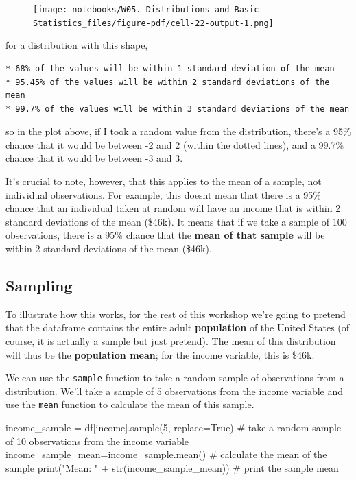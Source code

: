 \documentclass[
  letterpaper,
  DIV=11,
  numbers=noendperiod]{scrreprt}
\newenvironment{Shaded}{\begin{snugshade}}{\end{snugshade}}
\newcommand{\BuiltInTok}[1]{\textcolor[rgb]{0.00,0.23,0.31}{#1}}
\newcommand{\CommentTok}[1]{\textcolor[rgb]{0.37,0.37,0.37}{#1}}
\newcommand{\DecValTok}[1]{\textcolor[rgb]{0.68,0.00,0.00}{#1}}
\newcommand{\NormalTok}[1]{\textcolor[rgb]{0.00,0.23,0.31}{#1}}
\newcommand{\OperatorTok}[1]{\textcolor[rgb]{0.37,0.37,0.37}{#1}}
\newcommand{\StringTok}[1]{\textcolor[rgb]{0.13,0.47,0.30}{#1}}
\newcommand{\VariableTok}[1]{\textcolor[rgb]{0.07,0.07,0.07}{#1}}
\begin{document}
\begin{figure}[H]

{\centering \texttt{[image: notebooks/W05. Distributions and Basic Statistics\_files/figure-pdf/cell-22-output-1.png]}

}

\end{figure}

for a distribution with this shape,

\begin{verbatim}
* 68% of the values will be within 1 standard deviation of the mean
* 95.45% of the values will be within 2 standard deviations of the mean
* 99.7% of the values will be within 3 standard deviations of the mean
\end{verbatim}

so in the plot above, if I took a random value from the distribution,
there's a 95\% chance that it would be between -2 and 2 (within the
dotted lines), and a 99.7\% chance that it would be between -3 and 3.

It's crucial to note, however, that this applies to the mean of a
sample, not individual observations. For example, this doesnt mean that
there is a 95\% chance that an individual taken at random will have an
income that is within 2 standard deviations of the mean (\$46k). It
means that if we take a sample of 100 observations, there is a 95\%
chance that the \textbf{mean of that sample} will be within 2 standard
deviations of the mean (\$46k).

\hypertarget{sampling}{%
\subsection{Sampling}\label{sampling}}

To illustrate how this works, for the rest of this workshop we're going
to pretend that the dataframe contains the entire adult
\textbf{population} of the United States (of course, it is actually a
sample but just pretend). The mean of this distribution will thus be the
\textbf{population mean}; for the income variable, this is \$46k.

We can use the \texttt{sample} function to take a random sample of
observations from a distribution. We'll take a sample of 5 observations
from the income variable and use the \texttt{mean} function to calculate
the mean of this sample.

\begin{Shaded}
\begin{Highlighting}[]
\NormalTok{income\_sample }\OperatorTok{=}\NormalTok{ df[}\StringTok{\textquotesingle{}income\textquotesingle{}}\NormalTok{].sample(}\DecValTok{5}\NormalTok{, replace}\OperatorTok{=}\VariableTok{True}\NormalTok{) }\CommentTok{\# take a random sample of 10 observations from the income variable}
\NormalTok{income\_sample\_mean}\OperatorTok{=}\NormalTok{income\_sample.mean() }\CommentTok{\# calculate the mean of the sample}
\BuiltInTok{print}\NormalTok{(}\StringTok{"Mean: "} \OperatorTok{+} \BuiltInTok{str}\NormalTok{(income\_sample\_mean)) }\CommentTok{\# print the sample mean}
\end{Highlighting}
\end{Shaded}
\end{document}
